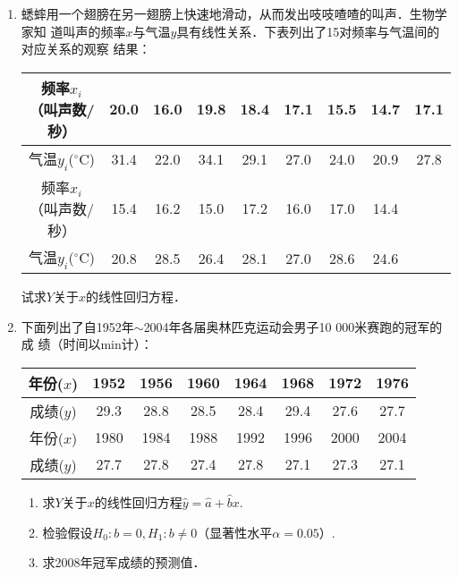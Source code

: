 \documentclass[10pt,a4paper]{article}
\begin{document}
\begin{enumerate}
    \item 蟋蟀用一个翅膀在另一翅膀上快速地滑动，从而发出吱吱喳喳的叫声．生物学家知
    道叫声的频率$x$与气温$y$具有线性关系．下表列出了15对频率与气温间的对应关系的观察
    结果：
    \renewcommand{\arraystretch}{1.3}
    \begin{table}[H]\centering
        \begin{tabular}{c|cccccccc}
        \hline
        频率$x_i$（叫声数/秒） & 20.0 & 16.0 & 19.8 & 18.4 & 17.1 & 15.5 & 14.7 & 17.1 \\ \hline
        气温$y_i$($^{\circ}$C)     & 31.4 & 22.0 & 34.1 & 29.1 & 27.0 & 24.0 & 20.9 & 27.8 \\ \hline
        频率$x_i$（叫声数/秒） & 15.4 & 16.2 & 15.0 & 17.2 & 16.0 & 17.0 & 14.4 &      \\ \hline
        气温$y_i$($^{\circ}$C)     & 20.8 & 28.5 & 26.4 & 28.1 & 27.0 & 28.6 & 24.6 &      \\ \hline
        \end{tabular}
    \end{table}
    \renewcommand{\arraystretch}{1.0}
    试求$Y$关于$x$的线性回归方程．




    \item 下面列出了自1952年$\sim$2004年各届奥林匹克运动会男子10 000米赛跑的冠军的成
    绩（时间以min计）：
    \renewcommand{\arraystretch}{1.3}
    \begin{table}[H]\centering
        \begin{tabular}{c|ccccccc}
        \hline
        年份($x$) & 1952 & 1956 & 1960 & 1964 & 1968 & 1972 & 1976 \\ \hline
        成绩($y$) & 29.3 & 28.8 & 28.5 & 28.4 & 29.4 & 27.6 & 27.7 \\ \hline
        年份($x$) & 1980 & 1984 & 1988 & 1992 & 1996 & 2000 & 2004 \\ \hline
        成绩($y$) & 27.7 & 27.8 & 27.4 & 27.8 & 27.1 & 27.3 & 27.1 \\ \hline
        \end{tabular}
    \end{table}
    \renewcommand{\arraystretch}{1.0}
    \begin{enumerate}
        \item 求$Y$关于$x$的线性回归方程$\hat{y}=\hat{a}+\hat{b}x$.
        \item 检验假设$H_0:b=0,H_1:b\neq 0$（显著性水平$\alpha=0.05$）.
        \item 求2008年冠军成绩的预测值．
    \end{enumerate}




\end{enumerate}
\end{document}
